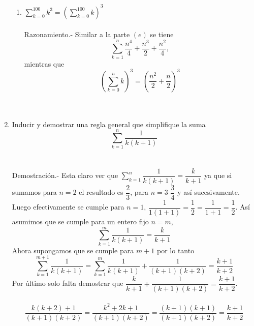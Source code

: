 \begin{enumerate}[\bfseries  1.]
\begin{enumerate}[\bfseries (a)]
\item $\displaystyle\sum_{k=0}^{100} k^3 = \left( \sum_{k=0}^{100} k \right) ^3$\\\\
Razonamiento.- \; Similar a  la parte $(e)$ se tiene $$\sum\limits_{k=1}^{n} \dfrac{n^4}{4} + \dfrac{n^3}{2} + \dfrac{n^2}{4},$$ mientras que $$\left( \sum\limits_{k=0}^{n} k \right)^3 = \left( \dfrac{n^2}{2} + \dfrac{n}{2}\right)^3$$\\\\
\end{enumerate} 

\item Inducir y demostrar una regla general que simplifique la suma $$\displaystyle\sum_{k=1}^{n} \dfrac{1}{k(k+1)}$$\\\\
Demostración.- \; Esta claro ver que $\sum\limits_{k=1}^{n} \dfrac{1}{k(k+1)} = \dfrac{k}{k+1}$ ya que si sumamos para $n=2$ el resultado es $\dfrac{2}{3}$, para $n=3$ $\dfrac{3}{4}$ y así sucesivamente.\\
Luego efectivamente se cumple para $n=1$,  $\dfrac{1}{1(1+1)} = \dfrac{1}{2} = \dfrac{1}{1+1} = \dfrac{1}{2}$. 
Así asumimos que se cumple para un entero fijo $n=m$,
$$\sum\limits_{k=1}^{m} \dfrac{1}{k(k+1)} = \dfrac{k}{k+1}$$
Ahora supongamos que se cumple para $m+1$ por lo tanto $$\sum\limits_{k=1}^{m+1} \dfrac{1}{k(k+1)} = \sum\limits_{k=1}^{m} \dfrac{1}{k(k+1)} + \dfrac{1}{(k+1)(k+2)} = \dfrac{k+1}{k+2}$$
Por último solo falta demostrar que $ \dfrac{k}{k+1} + \dfrac{1}{(k+1)(k+2)} = \dfrac{k+1}{k+2}$.\\\\
$$\dfrac{k(k+2)+1}{(k+1)(k+2)} = \dfrac{k^2 + 2k +1}{(k+1)(k+2)} = \dfrac{(k+1)(k+1)}{(k+1)(k+2)} = \dfrac{k+1}{k+2}$$\\\\


\end{enumerate}
